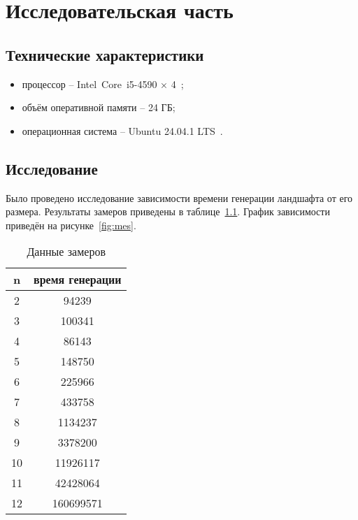 \chapter{Исследовательская часть}

\section{Технические характеристики}

\begin{itemize}
	\item процессор -- Intel\textregistered~Core\texttrademark~i5-4590 × 4~\cite{cpu};
	\item объём оперативной памяти -- 24 ГБ;
	\item операционная система -- Ubuntu 24.04.1 LTS~\cite{ubuntu}.	
\end{itemize}

\section{Исследование}

Было проведено исследование зависимости времени генерации ландшафта от его размера. Результаты замеров приведены в таблице~\ref{tbl:mes}. График зависимости приведён на рисунке~\ref{fig:mes}.

\begin{table}[H]
	\begin{center}
		\begin{threeparttable}
			\caption{Данные замеров}
			\label{tbl:mes}
			\begin{tabular}{|c|c|}
				\hline
				n &  время генерации \\
				\hline
				2 & 94239 \\
				\hline
				3 & 100341\\
				\hline
				4 & 86143\\
				\hline 
				5 & 148750\\
				\hline 
				6 & 225966\\
				\hline
				7 & 433758\\
				\hline
				8 & 1134237\\
				\hline
				9 & 3378200\\
				\hline 
				10 & 11926117\\
				\hline
				11 & 42428064\\
				\hline
				12 & 160699571\\
				\hline
			\end{tabular}	
		\end{threeparttable}
	\end{center}
\end{table}

